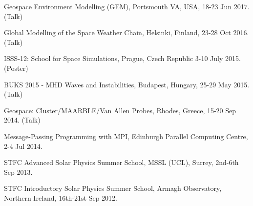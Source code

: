 \documentclass[11pt,a4paper]{article} %
\begin{document}
{{\bull Geospace Environment Modelling (GEM), Portsmouth VA, USA, 18-23 Jun 2017. (Talk)
\vspace{0.1cm}

\bull Global Modelling of the Space Weather Chain, Helsinki, Finland, 23-28 Oct 2016. (Talk) \vspace{0.1cm} %

\bull ISSS-12: School for Space Simulations, Prague, Czech Republic 3-10 July 2015. (Poster) \vspace{0.1cm}

\bull BUKS 2015 - MHD Waves and Instabilities, Budapest, Hungary, 25-29 May 2015. (Talk) \vspace{0.1cm}

\bull Geospace: Cluster/MAARBLE/Van Allen Probes, Rhodes, Greece, 15-20 Sep 2014. (Talk) \vspace{0.1cm}

\bull Message-Passing Programming with MPI, Edinburgh Parallel Computing Centre, 2-4 Jul 2014. \vspace{0.1cm}

\bull STFC Advanced Solar Physics Summer School, MSSL (UCL), Surrey, 2nd-6th Sep 2013. \vspace{0.1cm}


\bull STFC Introductory Solar Physics Summer School, Armagh Observatory, Northern Ireland, 16th-21st Sep 2012. \vspace{0.15cm}



					
					
					
}}
\end{document}
